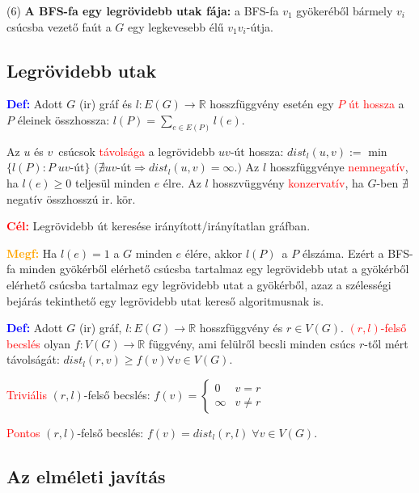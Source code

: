\documentclass[../szamtud.tex]{subfiles}
\begin{document}
			(6) \textbf{A BFS-fa egy legrövidebb utak fája:} a BFS-fa $v_1$ gyökeréből bármely $v_i$ csúcsba vezető faút a $G$ egy legkevesebb élű $v_1 v_i$-útja.

		\subsection{Legrövidebb utak}
				
			\textbf{\textcolor{blue}{Def:}} Adott $G$ (ir) gráf és $l : E(G) \rightarrow \mathbb{R}$ hosszfüggvény esetén egy \textcolor{red}{$P$ út hossza} a $P$ éleinek összhossza: $l(P) = \sum_{e\in E(P)} l(e)$.

			Az $u$ és $v$ csúcsok \textcolor{red}{távolsága} a legrövidebb $uv$-út hossza: $dist_l(u,v):=$ min$\{l(P):P \;uv$-út$\}$ $(\nexists uv$-út$\Rightarrow dist_l (u,v)= \infty.)$ Az $l$  hosszfüggvénye \textcolor{red}{nemnegatív}, ha $l(e) \geq 0$ teljesül minden $e$ élre. Az $l$ hosszvüggvény \textcolor{red}{konzervatív}, ha $G$-ben $\nexists$ negatív összhosszú ir. kör.

			\textbf{\textcolor{red}{Cél:}} Legrövidebb út keresése irányított/irányítatlan gráfban.

			\textbf{\textcolor{orange}{Megf:}} Ha $l(e) = 1 $ a $G$ minden $e$ élére, akkor $l(P)$ a $P$ élszáma. Ezért a BFS-fa minden gyökérből elérhető csúcsba tartalmaz egy legrövidebb utat a gyökérből elérhető csúcsba tartalmaz egy legrövidebb utat a gyökérből, azaz a szélességi bejárás tekinthető egy legrövidebb utat kereső algoritmusnak is. 

			\textbf{\textcolor{blue}{Def:}} Adott $G$ (ir) gráf, $l : E(G) \rightarrow \mathbb{R}$ hosszfüggvény és $r \in V(G)$. \textcolor{red}{$(r,l)$-felső becslés} olyan $f: V(G) \rightarrow \mathbb{R}$ függvény, ami felülről becsli minden csúcs $r$-től mért távolságát: $dist_l (r,v) \geq f(v) \forall v \in V(G)$.

			\textcolor{red}{Triviális} $(r,l)$-felső becslés:
			$
				f(v) = \begin{cases}
					0 & v = r \\
					\infty & v \neq r
				\end{cases}
			$

			\textcolor{red}{Pontos} $(r,l)$-felső becslés: $f(v) = dist_l(r,l)\; \forall v \in V(G)$.

		\subsection{Az elméleti javítás}
\end{document}
